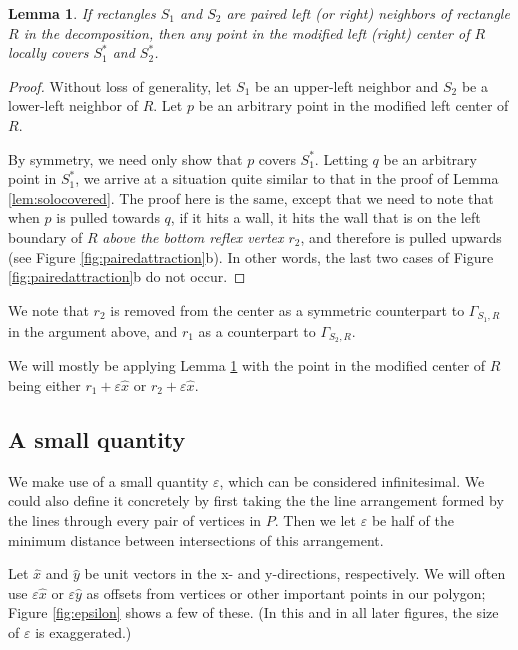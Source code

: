 \documentclass{article}
\newtheorem{lemma}{Lemma}
\newcommand{\curl}[2]{\ensuremath{\Gamma_{#1, #2}}}
\begin{document}
	\begin{lemma}\label{lem:pairedcovered}
		If rectangles $S_1$ and $S_2$ are paired left (or right) neighbors of
		rectangle $R$ in the decomposition, then any point in the modified left (right) center
		of $R$ locally covers $S_1^*$ and $S_2^*$.
	\end{lemma}
	\begin{proof}
		Without loss of generality, let $S_1$ be an upper-left neighbor and $S_2$ be a
		lower-left neighbor of $R$.
		Let $p$ be an arbitrary point in the modified left center of $R$.
		
		By symmetry, we need only show that $p$ covers $S_1^*$.
		Letting $q$ be an arbitrary point in $S_1^*$, we arrive at a situation
		quite similar to that in the proof of Lemma \ref{lem:solocovered}.
		The proof here is the same, except that we need to note that when $p$ is pulled
		towards $q$, if it hits a wall, it hits the wall that is on the left boundary of $R$
		\emph{above the bottom reflex vertex $r_2$}, and therefore is pulled upwards
		(see Figure \ref{fig:pairedattraction}b).  In other words, the last two cases
		of Figure \ref{fig:pairedattraction}b do not occur.
	\end{proof}
	
	We note that $r_2$ is removed from the center as a symmetric counterpart to
	\curl{S_1}{R} in the argument above, and $r_1$ as a counterpart to
	\curl{S_2}{R}.
	
	We will mostly be applying Lemma
	\ref{lem:pairedcovered} with the point in the modified center of $R$ being
	either $r_1 + \varepsilon\hat{x}$ or $r_2 + \varepsilon\hat{x}$.
	
	
	\subsection{A small quantity}
	We make use of a small quantity $\varepsilon$, which can be considered
	infinitesimal.
	We could also define it concretely by first taking the the line arrangement
	formed by the lines through every pair of vertices in $P$.
	Then we let $\varepsilon$ be half of the minimum distance between
	intersections of this arrangement.
	
	Let $\hat{x}$ and $\hat{y}$ be unit vectors
	in the x- and y-directions, respectively.
	We will often use $\varepsilon \hat{x}$ or $\varepsilon \hat{y}$ as offsets from
	vertices or other important points in our polygon; Figure \ref{fig:epsilon}
	shows a few of these.
	(In this and in all later figures, the size of $\varepsilon$ is exaggerated.)
	
\end{document}
